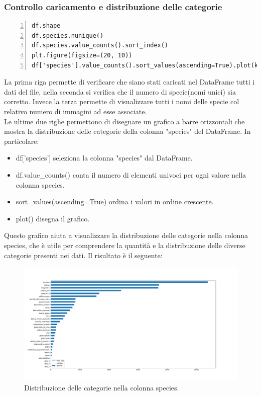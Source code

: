 \documentclass[a4paper,final,12pt]{report}
\begin{document}
\subsubsection{Controllo caricamento e distribuzione delle categorie}
\begin{lstlisting}[caption={Controllo del corretto caricamento dei dati.}, label={lst:Controllo_caricamento_dati}, breaklines, escapechar=`\%, frame=lines, basicstyle=\small\ttfamily, keepspaces=true, numbers=left]
df.shape
df.species.nunique()
df.species.value_counts().sort_index()
plt.figure(figsize=(20, 10))
df['species'].value_counts().sort_values(ascending=True).plot(kind='barh');
\end{lstlisting}
La prima riga permette di verificare che siano stati caricati nel DataFrame tutti i dati del file, nella seconda si verifica che il numero di specie(nomi unici) sia corretto. Invece la terza permette di visualizzare tutti i nomi delle specie col relativo numero di immagini ad esse associate.\\
Le ultime due righe permettono di disegnare un grafico a barre orizzontali che mostra la distribuzione delle categorie della colonna "species" del DataFrame. In particolare:
\begin{itemize}
    \item df['species'] seleziona la colonna "species" dal DataFrame.
    \item df.value\_counts() conta il numero di elementi univoci per ogni valore nella colonna species.
    \item sort\_values(ascending=True) ordina i valori in ordine crescente.
    \item plot() disegna il grafico.
\end{itemize}
Questo grafico aiuta a visualizzare la distribuzione delle categorie nella colonna species, che è utile per comprendere la quantità e la distribuzione delle diverse categorie presenti nei dati. Il risultato è il seguente:
\begin{figure}[hbtp]
\centering
\includegraphics[scale=0.26]{img_concettuale/numEsemp.png}
\caption{Distribuzione delle categorie nella colonna species.}
\end{figure}
\end{document}
